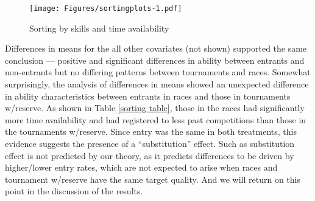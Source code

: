 \documentclass[11pt, titlepage]{article}
\begin{document}
\begin{figure}
\caption{Sorting by skills and time availability}
\label{sorting plot}
\texttt{[image: Figures/sortingplots-1.pdf]}
\end{figure}

Differences in means for the all other covariates (not shown) supported
the same conclusion --- positive and significant differences in ability
between entrants and non-entrants but no differing patterns between
tournaments and races. Somewhat surprisingly, the analysis of
differences in means showed an unexpected difference in ability
characteristics between entrants in races and those in tournaments
w/reserve. As shown in Table \ref{sorting table}, those in the races had
significantly more time availability and had registered to less past
competitions than those in the tournaments w/reserve. Since entry was
the same in both treatments, this evidence suggests the presence of a
``substitution'' effect. Such as substitution effect is not predicted by
our theory, as it predicts differences to be driven by higher/lower
entry rates, which are not expected to arise when races and tournament
w/reserve have the same target quality. And we will return on this point
in the discussion of the results.
\end{document}
